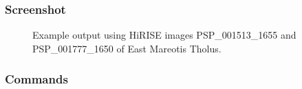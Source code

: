\subsubsection*{Screenshot}

\begin{figure}[h!]
\centering
  \hfil
\caption{Example output using HiRISE images PSP\_001513\_1655 and
  PSP\_001777\_1650 of East Mareotis Tholus.}
\label{fig:hirise_chills_example}
\end{figure}

\subsubsection*{Commands}

